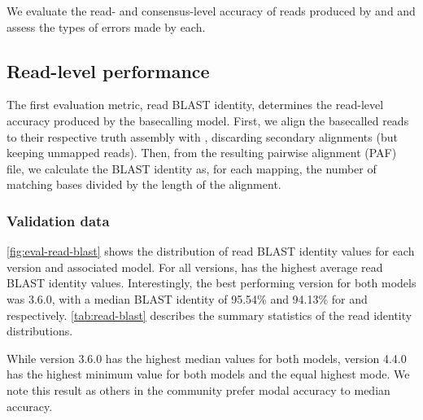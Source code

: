 We evaluate the read- and consensus-level accuracy of reads produced by \guppy{} and \tubby{} and assess the types of errors made by each. 

\subsection{Read-level performance}
\label{sec:tubby-read}

The first evaluation metric, read BLAST identity, determines the read-level accuracy produced by the basecalling model. First, we align the basecalled reads to their respective truth assembly with , discarding secondary alignments (but keeping unmapped reads). Then, from the resulting pairwise alignment (PAF) file, we calculate the BLAST identity as, for each mapping, the number of matching bases divided by the length of the alignment. 

\subsubsection{Validation data}

\autoref{fig:eval-read-blast} shows the distribution of read BLAST identity values for each \guppy{} version and associated \tubby{} model. For all versions, \tubby{} has the highest average read BLAST identity values. Interestingly, the best performing version for both models was 3.6.0, with a median BLAST identity of 95.54\% and 94.13\% for \tubby{} and \guppy{} respectively. \autoref{tab:read-blast} describes the summary statistics of the read identity distributions.

While version 3.6.0 has the highest median values for both models, version 4.4.0 has the highest minimum value for both models and the equal highest mode. We note this result as others in the \ont{} community prefer modal accuracy to median accuracy.

